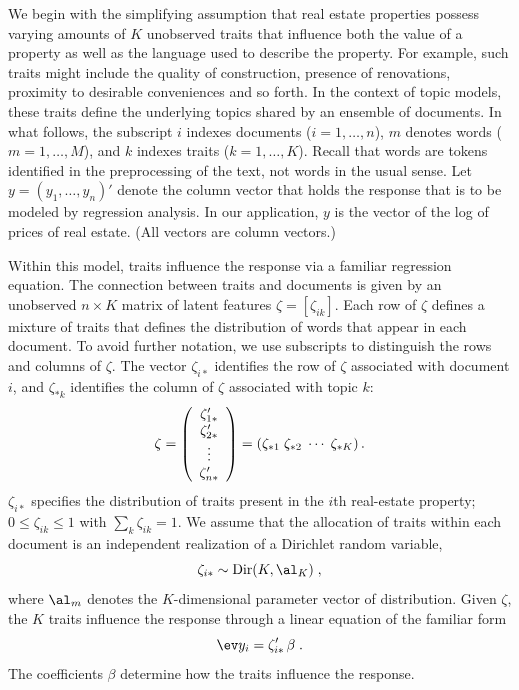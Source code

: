 \documentclass[10pt]{article}
\begin{document}
 We begin with the simplifying assumption that real estate properties possess
 varying amounts of $K$ unobserved traits that influence both the value of
 a property as well as the language used to describe the property.  For example,
 such traits might include the quality of construction, presence of renovations,
 proximity to desirable conveniences and so forth.  In the context of topic models, these traits define the underlying topics shared by an ensemble of documents.  In what follows, the subscript $i$ indexes documents ($i = 1,\ldots,n$), $m$ denotes words ($m=1,\ldots,M$), and $k$ indexes traits ($k = 1,\ldots,K$).  Recall that words are tokens identified in the preprocessing of the text, not words in the usual sense.   Let $y = (y_1,\ldots,y_n)'$ denote the column vector that holds the response that is to be modeled by regression analysis.    In our application, $y$ is the vector of the log of prices of real estate. (All vectors are column vectors.)


 Within this model, traits influence the response via a familiar regression
 equation.  The connection between traits and documents is given by an unobserved $n \times K$ matrix of latent features $\zeta = [\zeta_{ik}]$.  Each row of $\zeta$ defines a mixture of traits that defines the distribution of words that appear in each document.  To avoid further notation, we use subscripts to distinguish the rows and columns of $\zeta$.  The vector $\zeta_{i*}$ identifies the row of $\zeta$ associated with document $i$, and $\zeta_{*k}$ identifies the column of $\zeta$ associated with topic $k$:
 \begin{displaymath}
   \zeta = \left( \begin{array}{c}
                    \zeta_{1*}' \cr \zeta_{2*}' \cr \vdots \cr \zeta_{n*}'
                  \end{array}
           \right) 
         = \left( \zeta_{*1} \; \zeta_{*2} \; \cdots \; \zeta_{*K} \right).
 \end{displaymath}
 $\zeta_{i*}$ specifies the distribution of traits present in the $i$th real-estate property; $0 \le \zeta_{ik} \le 1$ with $\sum_k \zeta_{ik} = 1$.  We assume that the allocation of traits within each document is an independent realization of a Dirichlet random variable, 
 \begin{equation}
  \zeta_{i*} \sim \mbox{Dir}(K, \al_K) \;,
  \label{eq:zeta}
\end{equation}
where $\al_m$ denotes the $K$-dimensional parameter vector of distribution.    Given $\zeta$, the $K$ traits  influence the response through a linear equation of the familiar form
 \begin{equation}
    \ev y_i = \zeta_{i*}' \, \beta \;.
 \label{eq:regr}
 \end{equation}
 The coefficients $\beta$ determine how the traits influence the response.  
\end{document}
